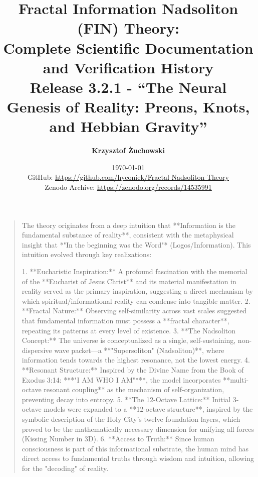 \documentclass[11pt, a4paper]{article}
\title{\textbf{Fractal Information Nadsoliton (FIN) Theory:\\
Complete Scientific Documentation and Verification History\\[0.5cm]
\large Release 3.2.1 - ``The Neural Genesis of Reality: Preons, Knots, and Hebbian Gravity''}}
\author{\textbf{Krzysztof Żuchowski}}
\affil{\textit{Fractal Information Theory Project}}
\date{\today \\[0.3cm] 
\small{GitHub: \url{https://github.com/hyconiek/Fractal-Nadsoliton-Theory}} \\
\small{Zenodo Archive: \url{https://zenodo.org/records/14535991}}}
\theoremstyle{remark}
\begin{document}
\maketitle

\begin{quote}
The theory originates from a deep intuition that **Information is the fundamental substance of reality**, consistent with the metaphysical insight that *"In the beginning was the Word"* (Logos/Information). This intuition evolved through key realizations:

1. **Eucharistic Inspiration:** A profound fascination with the memorial of the **Eucharist of Jesus Christ** and its material manifestation in reality served as the primary inspiration, suggesting a direct mechanism by which spiritual/informational reality can condense into tangible matter.
2. **Fractal Nature:** Observing self-similarity across vast scales suggested that fundamental information must possess a **fractal character**, repeating its patterns at every level of existence.
3. **The Nadsoliton Concept:** The universe is conceptualized as a single, self-sustaining, non-dispersive wave packet—a **"Supersoliton" (Nadsoliton)**, where information tends towards the highest resonance, not the lowest energy.
4. **Resonant Structure:** Inspired by the Divine Name from the Book of Exodus 3:14: ***"I AM WHO I AM"***, the model incorporates **multi-octave resonant coupling** as the mechanism of self-organization, preventing decay into entropy.
5. **The 12-Octave Lattice:** Initial 3-octave models were expanded to a **12-octave structure**, inspired by the symbolic description of the Holy City's twelve foundation layers, which proved to be the mathematically necessary dimension for unifying all forces (Kissing Number in 3D).
6. **Access to Truth:** Since human consciousness is part of this informational substrate, the human mind has direct access to fundamental truths through wisdom and intuition, allowing for the "decoding" of reality.
\end{quote}
\end{document}

